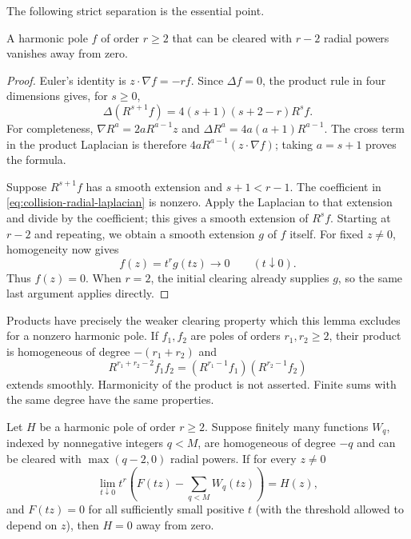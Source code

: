 The following strict separation is the essential point.

\begin{lemma}
\label{lem:collision-radial-separation}
A harmonic pole $f$ of order $r\geq2$ that can be cleared with $r-2$
radial powers vanishes away from zero.
\end{lemma}

\begin{proof}
Euler's identity is $z\cdot\nabla f=-rf$. Since $\Delta f=0$,
the product rule in four dimensions gives, for $s\geq0$,
\begin{equation}\label{eq:collision-radial-laplacian}
 \Delta(R^{s+1}f)
       =4(s+1)(s+2-r)R^sf.
\end{equation}
For completeness, $\nabla R^a=2aR^{a-1}z$ and
$\Delta R^a=4a(a+1)R^{a-1}$. The cross term in the product
Laplacian is therefore $4aR^{a-1}(z\cdot\nabla f)$; taking
$a=s+1$ proves the formula.

Suppose $R^{s+1}f$ has a smooth extension and $s+1<r-1$.
The coefficient in \eqref{eq:collision-radial-laplacian} is nonzero.
Apply the Laplacian to that extension and divide by the coefficient;
this gives a smooth extension of $R^sf$. Starting at $r-2$ and
repeating, we obtain a smooth extension $g$ of $f$ itself. For fixed
$z\ne0$, homogeneity now gives
\[
 f(z)=t^r g(tz)\longrightarrow0\qquad(t\downarrow0).
\]
Thus $f(z)=0$. When $r=2$, the initial clearing already supplies $g$,
so the same last argument applies directly.
\end{proof}

Products have precisely the weaker clearing property which this lemma
excludes for a nonzero harmonic pole. If $f_1,f_2$ are poles of orders
$r_1,r_2\geq2$, their product is homogeneous of degree
$-(r_1+r_2)$ and
\[
 R^{r_1+r_2-2}f_1f_2
       =(R^{r_1-1}f_1)(R^{r_2-1}f_2)
\]
extends smoothly. Harmonicity of the product is not asserted.
Finite sums with the same degree have the same properties.

\begin{lemma}
\label{lem:collision-product-separation}
Let $H$ be a harmonic pole of order $r\geq2$. Suppose finitely many
functions $W_q$, indexed by nonnegative integers $q<M$, are homogeneous
of degree $-q$ and can be cleared with $\max(q-2,0)$ radial powers.
If for every $z\ne0$
\begin{equation}\label{eq:collision-residue-expansion}
 \lim_{t\downarrow0}t^r
       \left(F(tz)-\sum_{q<M}W_q(tz)\right)=H(z),
\end{equation}
and $F(tz)=0$ for all sufficiently small positive $t$ (with the threshold
allowed to depend on $z$), then $H=0$ away from zero.
\end{lemma}

